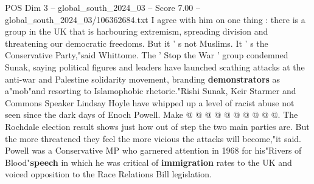 \begin{textsample}{POS Dim 3 – global\_south\_2024\_03 – Score 7.00 – global\_south\_2024\_03/106362684.txt}
I agree with him on one thing : there is a group in the UK that is harbouring extremism, spreading division and threatening our democratic freedoms.
But it ' s not Muslims.
It ' s the Conservative Party,"said Whittome.
The ' Stop the War ' group condemned Sunak, saying political figures and leaders have launched scathing attacks at the anti-war and Palestine solidarity movement, branding \textbf{demonstrators} as a"mob"and resorting to Islamophobic rhetoric."Rishi Sunak, Keir Starmer and Commons Speaker Lindsay Hoyle have whipped up a level of racist abuse not seen since the dark days of Enoch Powell.
Make @ @ @ @ @ @ @ @ @ @.
The Rochdale election result shows just how out of step the two main parties are.
But the more threatened they feel the more vicious the attacks will become,"it said.
Powell was a Conservative MP who garnered attention in 1968 for his"Rivers of Blood"\textbf{speech} in which he was critical of \textbf{immigration} rates to the UK and voiced opposition to the Race Relations Bill legislation.

\end{textsample}
